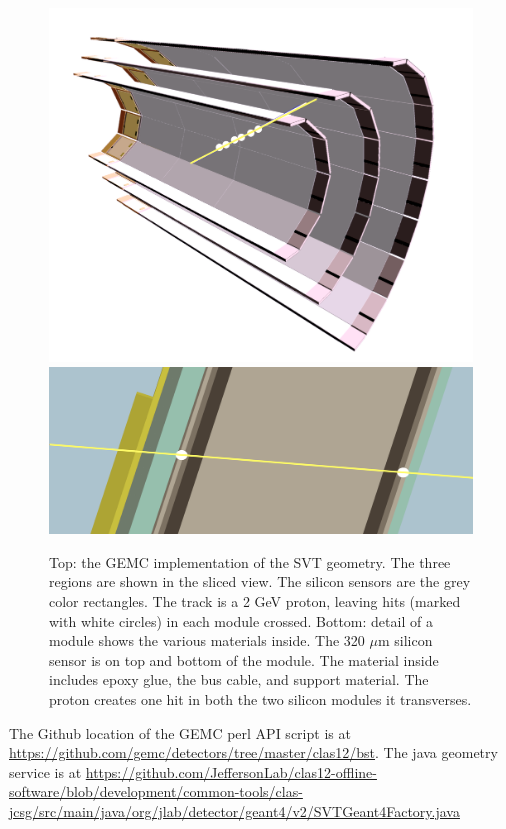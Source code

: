 \begin{figure}
	\centering
	\includegraphics[width=0.99\columnwidth,keepaspectratio]{img/bstGeometry.png}
	\includegraphics[width=0.99\columnwidth,keepaspectratio]{img/bstDetail.png}
	\caption{Top: the GEMC implementation of the SVT geometry. The three regions are shown in the sliced view. The silicon sensors are
           the grey color rectangles. The track is a 2 GeV proton, leaving hits (marked with white circles) in each module crossed. Bottom: detail of a module shows
           the various materials inside. The 320 $\mu$m silicon sensor is on top and bottom of the module.
           The material inside includes epoxy glue, the bus cable, and support material. The proton creates one hit
		   in both the two silicon modules it transverses.}
	\label{fig:bstGeometry}
\end{figure}


The Github location of the GEMC perl API script is at \url{https://github.com/gemc/detectors/tree/master/clas12/bst}.
The java geometry service is at
\url{https://github.com/JeffersonLab/clas12-offline-software/blob/development/common-tools/clas-jcsg/src/main/java/org/jlab/detector/geant4/v2/SVTGeant4Factory.java}


